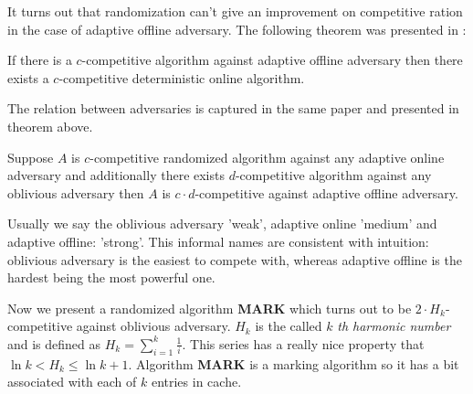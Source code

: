 It turns out that randomization can't give an improvement on competitive 
ration in the case of adaptive offline adversary. The following theorem was 
presented in \cite{power}:
\begin{theorem}
If there is a $c$-competitive algorithm against adaptive offline adversary then 
there exists a $c$-competitive deterministic online algorithm. 
\end{theorem}
The relation between adversaries is captured in the same paper and presented in 
theorem above.
\begin{theorem}
Suppose $A$ is $c$-competitive randomized algorithm against any adaptive online 
adversary and additionally there exists $d$-competitive algorithm against any 
oblivious adversary then $A$ is $c \cdot d$-competitive against adaptive 
offline adversary.
\end{theorem}
Usually we say the oblivious adversary 'weak', adaptive online 'medium' and 
adaptive offline: 'strong'. This informal names are consistent with intuition: 
oblivious adversary is the easiest to compete with, whereas adaptive offline is 
the hardest being the most powerful one.

Now we present a randomized algorithm \textbf{MARK} which turns out to be 
$2 \cdot H_k$-competitive against oblivious adversary. $H_k$ is the called $k$
\textit{th harmonic number} and is defined as $H_k = \sum^k_{i=1} \frac{1}{i}$. 
This series has a really nice property that $\ln k < H_k \leq \ln k + 1$. 
Algorithm \textbf{MARK} is a marking algorithm so it has a bit associated with 
each of $k$ entries in cache.

